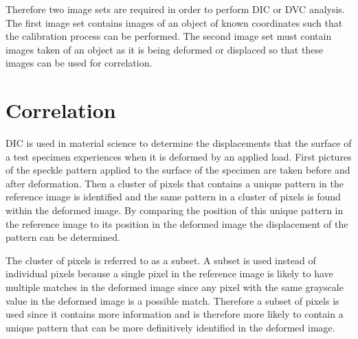 Therefore two image sets are required in order to perform DIC or DVC analysis. The first image set contains images of an object of known coordinates such that the calibration process can be performed. The second image set must contain images taken of an object as it is being deformed or displaced so that these images can be used for correlation.

\section{Correlation}
DIC is used in material science to determine the displacements that the surface of a test specimen experiences when it is deformed by an applied load. First pictures of the speckle pattern applied to the surface of the specimen are taken before and after deformation. Then a cluster of pixels that contains a unique pattern in the reference image is identified and the same pattern in a cluster of pixels is found within the deformed image. By comparing the position of this unique pattern in the reference image to its position in the deformed image the displacement of the pattern can be determined.

The cluster of pixels is referred to as a subset. A subset is used instead of individual pixels because a single pixel in the reference image is likely to have multiple matches in the deformed image since any pixel with the same grayscale value in the deformed image is a possible match. Therefore a subset of pixels is used since it contains more information and is therefore more likely to contain a unique pattern that can be more definitively identified in the deformed image.



